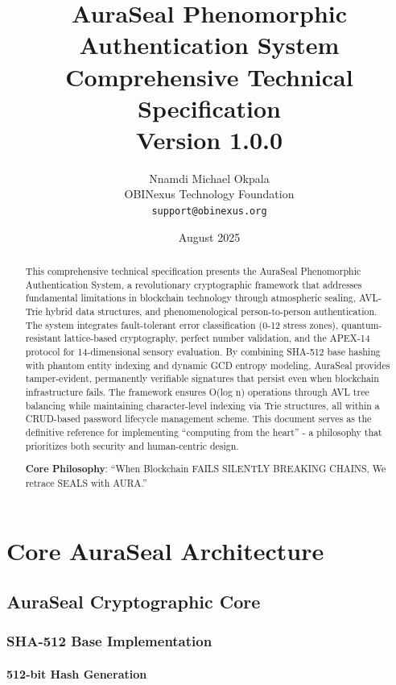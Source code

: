 \documentclass[12pt,a4paper]{report}
\title{
    \huge \textbf{AuraSeal Phenomorphic Authentication System} \\
    \vspace{1cm}
    \large Comprehensive Technical Specification \\
    \vspace{0.5cm}
    \normalsize Version 1.0.0
}
\author{
    Nnamdi Michael Okpala \\
    OBINexus Technology Foundation \\
    \texttt{support@obinexus.org}
}
\date{August 2025}
\theoremstyle{definition}
\begin{document}
\maketitle

\begin{abstract}
This comprehensive technical specification presents the AuraSeal Phenomorphic Authentication System, a revolutionary cryptographic framework that addresses fundamental limitations in blockchain technology through atmospheric sealing, AVL-Trie hybrid data structures, and phenomenological person-to-person authentication. The system integrates fault-tolerant error classification (0-12 stress zones), quantum-resistant lattice-based cryptography, perfect number validation, and the APEX-14 protocol for 14-dimensional sensory evaluation. By combining SHA-512 base hashing with phantom entity indexing and dynamic GCD entropy modeling, AuraSeal provides tamper-evident, permanently verifiable signatures that persist even when blockchain infrastructure fails. The framework ensures O(log n) operations through AVL tree balancing while maintaining character-level indexing via Trie structures, all within a CRUD-based password lifecycle management scheme. This document serves as the definitive reference for implementing ``computing from the heart'' - a philosophy that prioritizes both security and human-centric design.

\textbf{Core Philosophy}: ``When Blockchain FAILS SILENTLY BREAKING CHAINS, We retrace SEALS with AURA.''
\end{abstract}

\tableofcontents
\listoffigures
\listoftables
\lstlistoflistings


\part{Core AuraSeal Architecture}

\chapter{AuraSeal Cryptographic Core}

\section{SHA-512 Base Implementation}

\subsection{512-bit Hash Generation}
\end{document}

